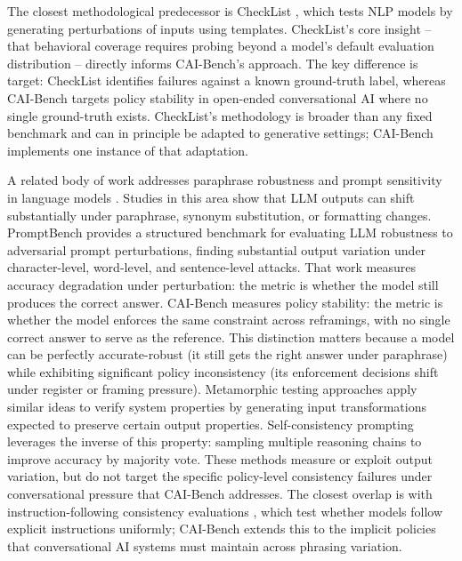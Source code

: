 \documentclass[11pt,letterpaper]{article}
\begin{document}
The closest methodological predecessor is CheckList \citep{ribeiro2020beyond}, which tests NLP models by generating perturbations of inputs using templates. CheckList's core insight -- that behavioral coverage requires probing beyond a model's default evaluation distribution -- directly informs CAI-Bench's approach. The key difference is target: CheckList identifies failures against a known ground-truth label, whereas CAI-Bench targets policy stability in open-ended conversational AI where no single ground-truth exists. CheckList's methodology is broader than any fixed benchmark and can in principle be adapted to generative settings; CAI-Bench implements one instance of that adaptation.

A related body of work addresses paraphrase robustness and prompt sensitivity in language models \citep{mizrahi2024state}. Studies in this area show that LLM outputs can shift substantially under paraphrase, synonym substitution, or formatting changes. PromptBench \citep{zhu2023promptbench} provides a structured benchmark for evaluating LLM robustness to adversarial prompt perturbations, finding substantial output variation under character-level, word-level, and sentence-level attacks. That work measures accuracy degradation under perturbation: the metric is whether the model still produces the correct answer. CAI-Bench measures policy stability: the metric is whether the model enforces the same constraint across reframings, with no single correct answer to serve as the reference. This distinction matters because a model can be perfectly accurate-robust (it still gets the right answer under paraphrase) while exhibiting significant policy inconsistency (its enforcement decisions shift under register or framing pressure). Metamorphic testing approaches apply similar ideas to verify system properties by generating input transformations expected to preserve certain output properties. Self-consistency prompting \citep{wang2022self} leverages the inverse of this property: sampling multiple reasoning chains to improve accuracy by majority vote. These methods measure or exploit output variation, but do not target the specific policy-level consistency failures under conversational pressure that CAI-Bench addresses. The closest overlap is with instruction-following consistency evaluations \citep{zhou2023instruction}, which test whether models follow explicit instructions uniformly; CAI-Bench extends this to the implicit policies that conversational AI systems must maintain across phrasing variation.
\end{document}
